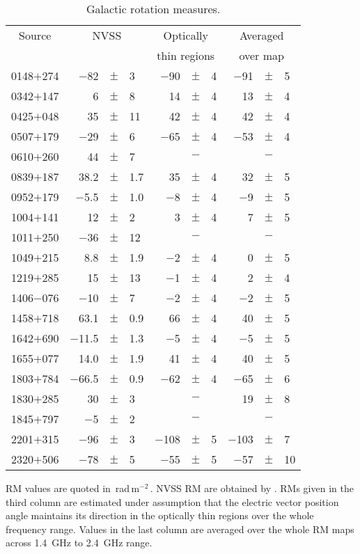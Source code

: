 \documentclass[a4paper,fleqn,usenatbib,useAMS]{mnras}
\newcommand{\rmu}{\,rad\,m$^{-2}$\,} %
\begin{document}
\begin{table}
  \caption{Galactic rotation measures.\label{gal_rm}}
  \begin{center}
  \begin{tabular}{cr@{}c@{}lr@{}c@{}lr@{}c@{}l}
  \hline
   Source&\multicolumn{3}{c}{NVSS}&\multicolumn{3}{c}{Optically}&\multicolumn{3}{c}{Averaged}\\
   &\multicolumn{3}{c}{}&\multicolumn{3}{c}{thin regions}&\multicolumn{3}{c}{over map}\\
  \hline
0148$+$274&$-$82&$\pm$&3&$-$90&$\pm$&4&$-$91&$\pm$&5\\
0342$+$147&6&$\pm$&8&14&$\pm$&4&13&$\pm$&4\\
0425$+$048&35&$\pm$&11&42&$\pm$&4&42&$\pm$&4\\
0507$+$179&$-$29&$\pm$&6&$-$65&$\pm$&4&$-$53&$\pm$&4\\
0610$+$260&44&$\pm$&7&&$-$&&&$-$&\\
0839$+$187&38.2&$\pm$&1.7&35&$\pm$&4&32&$\pm$&5\\
0952$+$179&$-$5.5&$\pm$&1.0&$-$8&$\pm$&4&$-$9&$\pm$&5\\
1004$+$141&12&$\pm$&2&3&$\pm$&4&7&$\pm$&5\\
1011$+$250&$-$36&$\pm$&12&&$-$&&&$-$&\\
1049$+$215&8.8&$\pm$&1.9&$-$2&$\pm$&4&0&$\pm$&5\\
1219$+$285&15&$\pm$&13&$-$1&$\pm$&4&2&$\pm$&4\\
1406$-$076&$-$10&$\pm$&7&$-$2&$\pm$&4&$-$2&$\pm$&5\\
1458$+$718&63.1&$\pm$&0.9&66&$\pm$&4&40&$\pm$&5\\
1642$+$690&$-$11.5&$\pm$&1.3&$-$5&$\pm$&4&$-$5&$\pm$&5\\
1655$+$077&14.0&$\pm$&1.9&41&$\pm$&4&40&$\pm$&5\\
1803$+$784&$-$66.5&$\pm$&0.9&$-$62&$\pm$&4&$-$65&$\pm$&6\\
1830$+$285&30&$\pm$&3&&$-$&&19&$\pm$&8\\
1845$+$797&$-$5&$\pm$&2&&$-$&&&$-$&\\
2201$+$315&$-$96&$\pm$&3&$-$108&$\pm$&5&$-$103&$\pm$&7\\
2320$+$506&$-$78&$\pm$&5&$-$55&$\pm$&5&$-$57&$\pm$&10\\
\hline
\end{tabular}
\end{center}
 RM values are quoted in \rmu. NVSS RM are obtained by \citet{taylor_etal09}.
 RMs given in the third column are estimated under assumption that the electric vector position 
 angle maintains its direction in the optically thin regions over the whole frequency range.
 Values in the last column are averaged over the whole RM maps across 1.4~GHz to 2.4~GHz range.
 \end{table}
\end{document}
